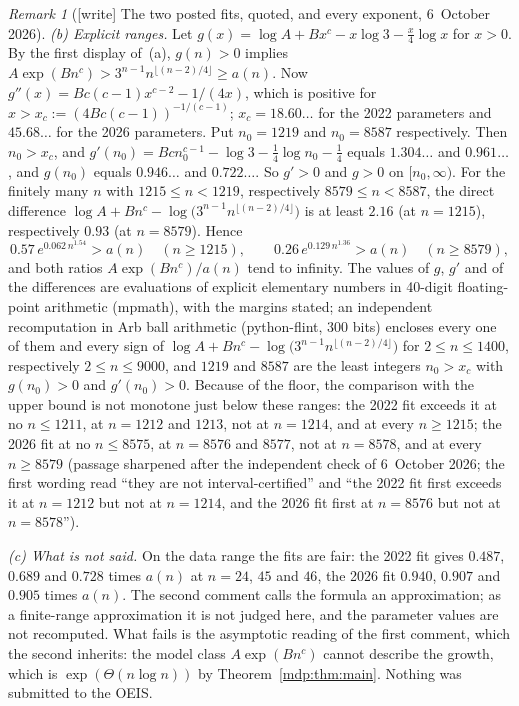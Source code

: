 \documentclass[11pt,letterpaper]{article}
\numberwithin{equation}{section}
\theoremstyle{remark}\newtheorem{remark}[theorem]{Remark}
\begin{document}
\begin{remark}[{[write]} The two posted fits, quoted, and every exponent, 6~October 2026]
\emph{(b) Explicit ranges.} Let
$g(x)=\log A+Bx^c-x\log3-\tfrac x4\log x$ for $x>0$. By the first display
of~(a), $g(n)>0$ implies
$A\exp(Bn^c)>3^{n-1}n^{\lfloor(n-2)/4\rfloor}\ge a(n)$. Now
$g''(x)=Bc(c-1)x^{c-2}-1/(4x)$, which is positive for
$x>x_c:=(4Bc(c-1))^{-1/(c-1)}$; $x_c=18.60\ldots$ for the 2022 parameters
and $45.68\ldots$ for the 2026 parameters. Put $n_0=1219$ and $n_0=8587$
respectively. Then $n_0>x_c$, and
$g'(n_0)=Bcn_0^{c-1}-\log3-\tfrac14\log n_0-\tfrac14$ equals $1.304\ldots$
and $0.961\ldots$, and $g(n_0)$ equals $0.946\ldots$ and $0.722\ldots$. So
$g'>0$ and $g>0$ on $[n_0,\infty)$. For the finitely many $n$ with
$1215\le n<1219$, respectively $8579\le n<8587$, the direct difference
$\log A+Bn^c-\log\bigl(3^{n-1}n^{\lfloor(n-2)/4\rfloor}\bigr)$ is at least
$2.16$ (at $n=1215$), respectively $0.93$ (at $n=8579$). Hence
\[
 0.57\,e^{0.062\,n^{1.54}}>a(n)\quad(n\ge1215),\qquad
 0.26\,e^{0.129\,n^{1.36}}>a(n)\quad(n\ge8579),
\]
and both ratios $A\exp(Bn^c)/a(n)$ tend to infinity. The values of $g$,
$g'$ and of the differences are evaluations of explicit elementary numbers
in 40-digit floating-point arithmetic (mpmath), with the margins stated;
an independent recomputation in Arb ball arithmetic (python-flint, 300 bits)
encloses every one of them and every sign of
$\log A+Bn^c-\log\bigl(3^{n-1}n^{\lfloor(n-2)/4\rfloor}\bigr)$ for
$2\le n\le1400$, respectively $2\le n\le9000$, and $1219$ and $8587$ are the
least integers $n_0>x_c$ with $g(n_0)>0$ and $g'(n_0)>0$. Because of the
floor, the comparison with the upper bound is not monotone just below these
ranges: the 2022 fit exceeds it at no $n\le1211$, at $n=1212$ and $1213$, not
at $n=1214$, and at every $n\ge1215$; the 2026 fit at no $n\le8575$, at
$n=8576$ and $8577$, not at $n=8578$, and at every $n\ge8579$
\textup{(passage sharpened after the independent check of 6~October 2026;
the first wording read ``they are not interval-certified'' and ``the 2022 fit
first exceeds it at $n=1212$ but not at $n=1214$, and the 2026 fit first at
$n=8576$ but not at $n=8578$'')}.

\emph{(c) What is not said.} On the data range the fits are fair: the 2022
fit gives $0.487$, $0.689$ and $0.728$ times $a(n)$ at $n=24$, $45$ and
$46$, the 2026 fit $0.940$, $0.907$ and $0.905$ times $a(n)$. The second
comment calls the formula an approximation; as a finite-range approximation
it is not judged here, and the parameter values are not recomputed. What
fails is the asymptotic reading of the first comment, which the second
inherits: the model class $A\exp(Bn^c)$ cannot describe the growth, which
is $\exp(\Theta(n\log n))$ by Theorem~\ref{mdp:thm:main}. Nothing was
submitted to the OEIS.
\end{remark}
\end{document}
